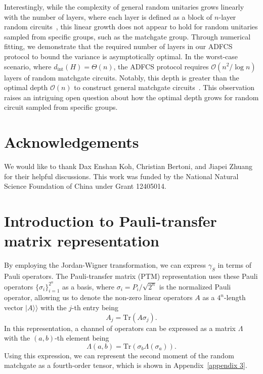 \documentclass[showpacs,twocolumn,aps,prx,long bibliography,superscriptaddress,notitlepage]{revtex4-1}
\newcommand{\supket}[1]{|#1 \rangle\rangle}
\newcommand{\cbra}[1]{\{ #1 \}}
\newcommand{\Ord}[1]{\mathcal{O}\left( #1 \right)}
\begin{document}
{Interestingly, while the complexity of general random unitaries grows linearly with the number of layers, where each layer is defined as a block of $n$-layer random circuits~\cite{haferkamp2022linear}, this linear growth does not appear to hold for random unitaries sampled from specific groups, such as the matchgate group.
Through numerical fitting, we demonstrate that the required number of layers in our ADFCS protocol to bound the variance is asymptotically optimal. In the worst-case scenario, where $d_{\text{int}}(H) = \Theta(n)$, the ADFCS protocol requires $\Ord{n^2 / \log n}$ layers of random matchgate circuits. Notably, this depth is greater than the optimal depth $\Ord{n}$ to construct general matchgate circuits~\cite{jiang2018quantum}.
 This observation raises an intriguing open question about how the optimal depth grows for random circuit sampled from specific groups.}


\section*{Acknowledgements}
 We would like to thank Dax Enshan Koh, Christian Bertoni, {and Jiapei Zhuang} for their helpful discussions.
This work was funded by the National Natural Science Foundation of China under Grant 12405014.





\appendix

\section{Introduction to Pauli-transfer matrix representation}
\label{appendix: intro_superoperator}

By employing the Jordan-Wigner transformation, we can express $\gamma_S$ in terms of Pauli operators. The Pauli-transfer matrix (PTM) representation uses these Pauli operators $\cbra{\sigma_i}_{i=1}^{2^n}$ as a basis, where $\sigma_i =P_i/\sqrt{2^n}$ is the normalized Pauli operator, allowing us to denote the non-zero linear operators $A$ as a $4^n$-length vector $\supket{A}$ with the $j$-th entry being
\begin{equation}
A_j = \text{Tr}(A \sigma_j).
\end{equation}
In this representation, a channel of operators can be expressed as a matrix $\Lambda$ with the $(a,b)$-th element being
\begin{equation}
\Lambda(a,b) = \text{Tr}(\sigma_b \Lambda(\sigma_a)).
\end{equation}
Using this expression, we can represent the second moment of the random matchgate as a fourth-order tensor, which is shown in Appendix~\ref{appendix 3}.
\end{document}
